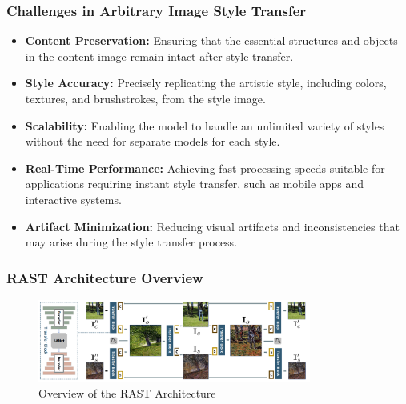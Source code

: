 \begin{frame}
\frametitle{Challenges in Arbitrary Image Style Transfer}

\begin{itemize}
    \item \textbf{Content Preservation:} Ensuring that the essential structures and objects in the content image remain intact after style transfer.
    \item \textbf{Style Accuracy:} Precisely replicating the artistic style, including colors, textures, and brushstrokes, from the style image.
    \item \textbf{Scalability:} Enabling the model to handle an unlimited variety of styles without the need for separate models for each style.
    \item \textbf{Real-Time Performance:} Achieving fast processing speeds suitable for applications requiring instant style transfer, such as mobile apps and interactive systems.
    \item \textbf{Artifact Minimization:} Reducing visual artifacts and inconsistencies that may arise during the style transfer process.
\end{itemize}

\end{frame}

\begin{frame}
\frametitle{RAST Architecture Overview}

\begin{figure}[H]
    \centering
    \includegraphics[width=0.8\textwidth]{figures/rast_architecture_overview.png} %
    \caption{Overview of the RAST Architecture}
    \label{fig:rast_architecture_overview}
\end{figure}

\end{frame}


